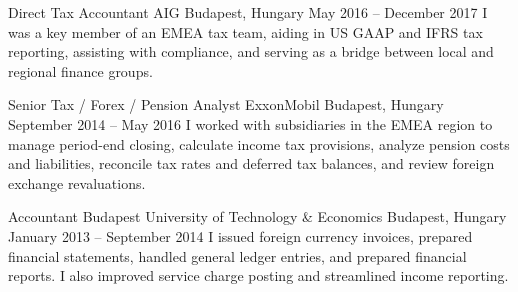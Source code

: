 \begin{cventries}

  \cventry
    {Direct Tax Accountant} %
    {AIG} %
    {Budapest, Hungary} %
    {May 2016 -- December 2017} %
    {} %
    {I was a key member of an EMEA tax team, aiding in US GAAP and IFRS tax reporting, assisting with compliance, and serving as a bridge between local and regional finance groups.} %


  \cventry
    {Senior Tax / Forex / Pension Analyst} %
    {ExxonMobil} %
    {Budapest, Hungary} %
    {September 2014 -- May 2016} %
    {} %
    {I worked with subsidiaries in the EMEA region to manage period-end closing, calculate income tax provisions, analyze pension costs and liabilities, reconcile tax rates and deferred tax balances, and review foreign exchange revaluations.} %


  \cventry
    {Accountant} %
    {Budapest University of Technology \& Economics} %
    {Budapest, Hungary} %
    {January 2013 -- September 2014} %
    {} %
    {I issued foreign currency invoices, prepared financial statements, handled general ledger entries, and prepared financial reports. I also improved service charge posting and streamlined income reporting.} %


\end{cventries}
